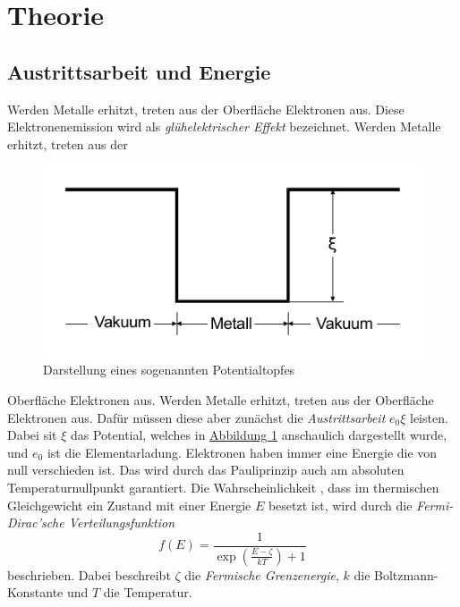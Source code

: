\section{Theorie}
\label{sec:Theorie}

\subsection{Austrittsarbeit und Energie}
\label{sec:Austrittsarbeit und Energie}
Werden Metalle erhitzt, treten aus der Oberfläche Elektronen aus.
Diese Elektronenemission wird als \textit{glühelektrischer Effekt} bezeichnet.
Werden Metalle erhitzt, treten aus der
\begin{figure}
    \caption{Darstellung eines sogenannten Potentialtopfes}\label{fig:Potentialtopf}
    \includegraphics[width=\linewidth]{pictures/Potentialtopf.pdf}
\end{figure} 
Oberfläche Elektronen aus.
Werden Metalle erhitzt, treten aus der Oberfläche Elektronen aus.
Dafür müssen diese aber zunächst die \textit{Austrittsarbeit} $e_0 \xi$ leisten.
Dabei sit $\xi$ das Potential, welches in \hyperref[fig:Potentialtopf]{Abbildung \ref{fig:Potentialtopf}} anschaulich dargestellt wurde, und
$e_0$ ist die Elementarladung.
Elektronen haben immer eine Energie die von null verschieden ist.
Das wird durch das Pauliprinzip auch am absoluten Temperaturnullpunkt garantiert.
Die Wahrscheinlichkeit , dass im thermischen Gleichgewicht ein Zustand mit einer Energie $E$ besetzt ist, wird durch die
\textit{Fermi-Dirac'sche Verteilungsfunktion}
\begin{equation}
    f(E)=\frac{1}{\exp \left(\frac{E-\zeta}{k T}\right)+1}
\end{equation}
beschrieben. Dabei beschreibt $\zeta$ die \textit{Fermische Grenzenergie}, $k$ die Boltzmann-Konstante und $T$ die Temperatur.

